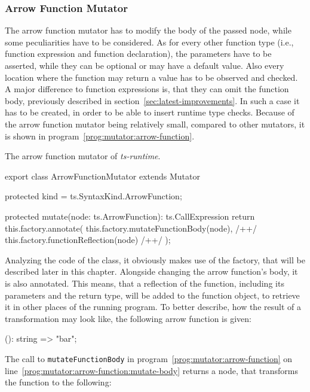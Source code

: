\subsubsection{Arrow Function Mutator}

The arrow function mutator has to modify the body of the passed node, while some peculiarities have to be considered. As for every other function type (i.e., function expression and function declaration), the parameters have to be asserted, while they can be optional or may have a default value. Also every location where the function may return a value has to be observed and checked. A major difference to function expressions is, that they can omit the function body, previously described in section~\ref{sec:latest-improvements}. In such a case it has to be created, in order to be able to insert runtime type checks. Because of the arrow function mutator being relatively small, compared to other mutators, it is shown in program~\ref{prog:mutator:arrow-function}.
\begin{program}
\caption{The arrow function mutator of \emph{ts-runtime}.}
\label{prog:mutator:arrow-function}
\begin{JsCode}
export class ArrowFunctionMutator extends Mutator {

  protected kind = ts.SyntaxKind.ArrowFunction;

  protected mutate(node: ts.ArrowFunction): ts.CallExpression {
    return this.factory.annotate(
      this.factory.mutateFunctionBody(node), /+\label{prog:mutator:arrow-function:mutate-body}+/
      this.factory.functionReflection(node) /+\label{prog:mutator:arrow-function:reflect}+/
    );
  }

}
\end{JsCode}
\end{program}
Analyzing the code of the class, it obviously makes use of the factory, that will be described later in this chapter. Alongside changing the arrow function's body, it is also annotated. This means, that a reflection of the function, including its parameters and the return type, will be added to the function object, to retrieve it in other places of the running program. To better describe, how the result of a transformation may look like, the following arrow function is given: 
\begin{JsCode}[numbers=none]
(): string => "bar";
\end{JsCode}
The call to \texttt{mutateFunctionBody} in program~\ref{prog:mutator:arrow-function} on line~\ref{prog:mutator:arrow-function:mutate-body} returns a node, that transforms the function to the following:
